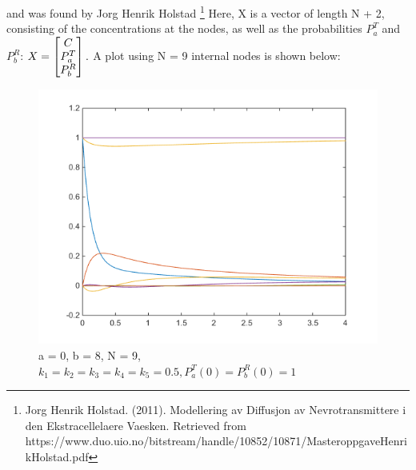 \documentclass[11pt, a4paper]{article}\usepackage[]{graphicx}\usepackage[]{color}
\begin{document}
and was found by Jorg Henrik Holstad \footnote{Jorg Henrik Holstad. (2011). Modellering av Diffusjon av Nevrotransmittere i den Ekstracellelaere Vaesken. Retrieved from https://www.duo.uio.no/bitstream/handle/10852/10871/MasteroppgaveHenrikHolstad.pdf}
Here, X is a vector of length N + 2, consisting of the concentrations at the nodes, as well as the probabilities $P_a^T$ and $P_b^R$:
$
X =
 \begin{bmatrix}
  C        \\
  P_a^T    \\
  P_b^R    \\
 \end{bmatrix}.\\
$
A plot using N = 9 internal nodes is shown below:

\begin{figure}[h!]
  \centering
    \includegraphics{ode45Trimmed}
      \caption{a = 0, b = 8, N = 9, $k_1=k_2=k_3=k_4=k_5 = 0.5, P_a^T(0) = P_b^R(0) = 1$}
\end{figure}
\end{document}
